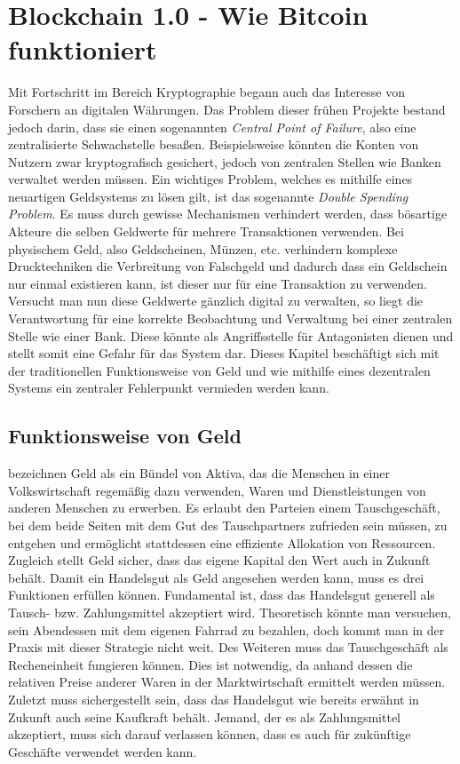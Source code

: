 \chapter{Blockchain 1.0 - Wie Bitcoin funktioniert}
Mit Fortschritt im Bereich Kryptographie begann auch das Interesse von Forschern an digitalen Währungen. 
Das Problem dieser frühen Projekte bestand jedoch darin, dass sie einen sogenannten \emph{Central Point of Failure}, also eine zentralisierte Schwachstelle besaßen. 
Beispielsweise könnten die Konten von Nutzern zwar kryptografisch gesichert, jedoch von zentralen Stellen wie Banken verwaltet werden müssen.
Ein wichtiges Problem, welches es mithilfe eines neuartigen Geldsystems zu lösen gilt, ist das sogenannte \emph{Double Spending Problem}. Es muss durch gewisse Mechanismen verhindert werden, dass bösartige Akteure die selben Geldwerte für mehrere Transaktionen verwenden. Bei physischem Geld, also Geldscheinen, Münzen, etc. verhindern komplexe Drucktechniken die Verbreitung von Falschgeld und dadurch dass ein Geldschein nur einmal existieren kann, ist dieser nur für eine Transaktion zu verwenden.
Versucht man nun diese Geldwerte gänzlich digital zu verwalten, so liegt die Verantwortung für eine korrekte Beobachtung und Verwaltung bei einer zentralen Stelle wie einer Bank. Diese könnte als Angriffsstelle für Antagonisten dienen und stellt somit eine Gefahr für das System dar.
Dieses Kapitel beschäftigt sich mit der traditionellen Funktionsweise von Geld und wie mithilfe eines dezentralen Systems ein zentraler Fehlerpunkt vermieden werden kann. 
\section{Funktionsweise von Geld}
\cite{mankiw_taylor_2018} bezeichnen Geld als ein Bündel von Aktiva, das die Menschen in einer Volkswirtschaft regemäßig dazu verwenden, Waren und Dienstleistungen von anderen Menschen zu erwerben.
Es erlaubt den Parteien einem Tauschgeschäft, bei dem beide Seiten mit dem Gut des Tauschpartners zufrieden sein müssen, zu entgehen und ermöglicht stattdessen eine effiziente Allokation von Ressourcen. Zugleich stellt Geld sicher, dass das eigene Kapital den Wert auch in Zukunft behält.
Damit ein Handelsgut als Geld angesehen werden kann, muss es drei Funktionen erfüllen können.
Fundamental ist, dass das Handelsgut generell als Tausch- bzw. Zahlungsmittel akzeptiert wird. Theoretisch könnte man versuchen, sein Abendessen mit dem eigenen Fahrrad zu bezahlen, doch kommt man in der Praxis mit dieser Strategie nicht weit.
Des Weiteren muss das Tauschgeschäft als Recheneinheit fungieren können. Dies ist notwendig, da anhand dessen die relativen Preise anderer Waren in der Marktwirtschaft ermittelt werden müssen.
Zuletzt muss sichergestellt sein, dass das Handelsgut wie bereits erwähnt in Zukunft auch seine Kaufkraft behält. Jemand, der es als Zahlungsmittel akzeptiert, muss sich darauf verlassen können, dass es auch für zukünftige Geschäfte verwendet werden kann.\\

